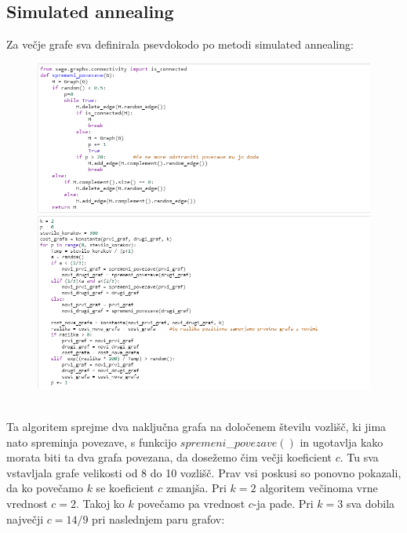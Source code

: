 \documentclass[12pt, a4paper]{article}
\begin{document}
\subsection{Simulated annealing}
Za večje grafe sva definirala psevdokodo po metodi simulated annealing:
\begin{figure}[h!]
\centering
\includegraphics[width=13.5cm]{slika_2}
\includegraphics[width=13.5cm]{slika_3}
\end{figure} \\
Ta algoritem sprejme dva naključna grafa na določenem številu vozlišč, ki jima nato spreminja povezave, s funkcijo $spremeni$\_$povezave()$ in ugotavlja kako morata biti ta dva grafa povezana, da dosežemo čim večji koeficient $c$. Tu sva vstavljala grafe velikosti od 8 do 10 vozlišč. Prav vsi poskusi so ponovno pokazali, da ko povečamo $k$ se koeficient $c$ zmanjša. Pri $k=2$ algoritem večinoma vrne vrednost $c=2$. Takoj ko $k$ povečamo pa vrednost $c$-ja pade. Pri $k=3$ sva dobila največji $c=14/9$ pri naslednjem paru grafov:
\end{document}
